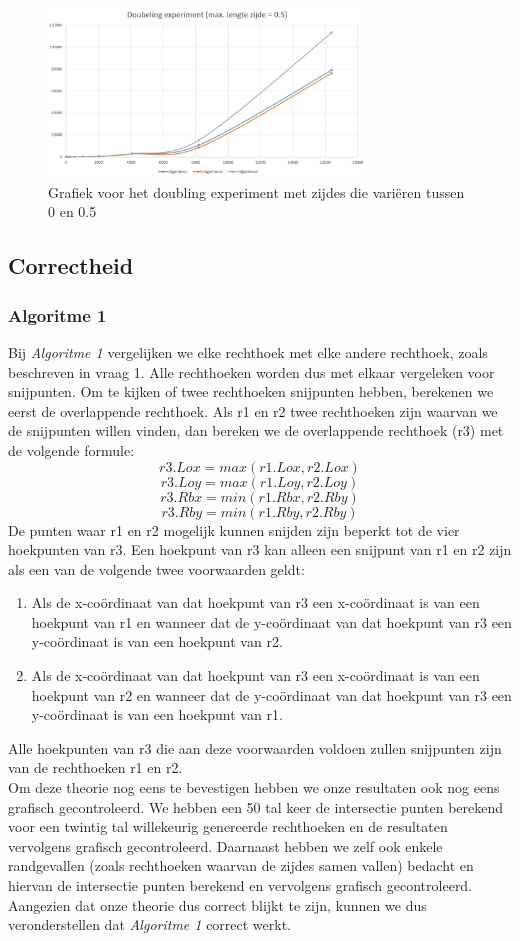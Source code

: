 \documentclass[11pt,a4paper,titlepage]{article}
\begin{document}
				\begin{figure}[H]
				\centering
				\includegraphics[width=0.75\textwidth]{zijde05.JPG}
				\caption{\label{fig:zijde05}Grafiek voor het doubling experiment met zijdes die variëren tussen 0 en 0.5}
				\end{figure}
		\subsection{Correctheid}
			\subsubsection{Algoritme 1}
				Bij \emph{Algoritme 1} vergelijken we elke rechthoek met elke andere rechthoek, zoals beschreven in vraag 1. Alle rechthoeken worden dus met elkaar vergeleken voor snijpunten. Om te kijken of twee rechthoeken snijpunten hebben, berekenen we eerst de overlappende rechthoek.  Als r1 en r2 twee rechthoeken zijn waarvan we de snijpunten willen vinden, dan bereken we de overlappende rechthoek (r3) met de volgende formule:
					$$r3.Lox = max(r1.Lox, r2.Lox)$$
					$$r3.Loy = max(r1.Loy, r2.Loy)$$
					$$r3.Rbx = min(r1.Rbx, r2.Rby)$$
					$$r3.Rby = min(r1.Rby, r2.Rby)$$
			De punten waar r1 en r2 mogelijk kunnen snijden zijn beperkt tot de vier hoekpunten van r3. Een hoekpunt van r3 kan alleen een snijpunt van r1 en r2 zijn als een van de volgende twee voorwaarden geldt:
				\begin{enumerate}
					\item Als de x-coördinaat van dat hoekpunt van r3 een x-coördinaat is van een hoekpunt van r1 en wanneer dat de y-coördinaat van dat hoekpunt van r3 een y-coördinaat is van een hoekpunt van r2.
					\item Als de x-coördinaat van dat hoekpunt van r3 een x-coördinaat is van een hoekpunt van r2 en wanneer dat de y-coördinaat van dat hoekpunt van r3 een y-coördinaat is van een hoekpunt van r1.
				\end{enumerate}
			Alle hoekpunten van r3 die aan deze voorwaarden voldoen zullen snijpunten zijn van de rechthoeken r1 en r2.  \\
			Om deze theorie nog eens te bevestigen hebben we onze resultaten ook nog eens grafisch gecontroleerd. We hebben een 50 tal keer de intersectie punten berekend voor een twintig tal willekeurig genereerde rechthoeken en de resultaten vervolgens grafisch gecontroleerd. Daarnaast hebben we zelf ook enkele randgevallen (zoals rechthoeken waarvan de zijdes samen vallen) bedacht en hiervan de intersectie punten berekend en vervolgens grafisch gecontroleerd. \\
			Aangezien dat onze theorie dus correct blijkt te zijn, kunnen we dus veronderstellen dat \emph{Algoritme 1} correct werkt.
\end{document}
